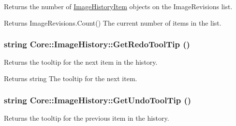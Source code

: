 \label{class_core_1_1_image_history_ae26bcfeed34a733dd372896a86bbc3d4}
Returns the number of \hyperlink{class_core_1_1_image_history_item}{ImageHistoryItem} objects on the ImageRevisions list. \begin{DoxyReturn}{Returns}
ImageRevisions.Count() The current number of items in the list. 
\end{DoxyReturn}
\hypertarget{class_core_1_1_image_history_a2c9d2a7856c91909f83f3cb8ddf0bf25}{
\subsubsection[{GetRedoToolTip}]{\setlength{\rightskip}{0pt plus 5cm}string Core::ImageHistory::GetRedoToolTip ()}}
\label{class_core_1_1_image_history_a2c9d2a7856c91909f83f3cb8ddf0bf25}
Returns the tooltip for the next item in the history.

\begin{DoxyReturn}{Returns}
string The tooltip for the next item. 
\end{DoxyReturn}
\hypertarget{class_core_1_1_image_history_af8a4f906b430aaaa9ec350ba4bc8d416}{
\subsubsection[{GetUndoToolTip}]{\setlength{\rightskip}{0pt plus 5cm}string Core::ImageHistory::GetUndoToolTip ()}}
\label{class_core_1_1_image_history_af8a4f906b430aaaa9ec350ba4bc8d416}
Returns the tooltip for the previous item in the history.


